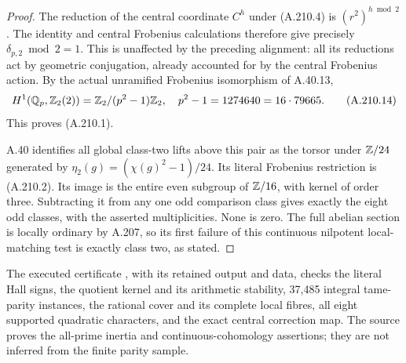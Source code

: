 \begin{proof}
The reduction of the central coordinate \(C^h\)
under (A.210.4) is \((r^2)^{h\bmod2}\).
The identity and central Frobenius calculations
therefore give precisely \(\delta_{p,2}\bmod2=1\).
This is unaffected by the preceding alignment:
all its reductions act by geometric conjugation,
already accounted for by the central Frobenius action.
By the actual unramified Frobenius isomorphism of
A.40.13,
\[
 H^1(\mathbb Q_p,\mathbb Z_2(2))=\mathbb Z_2/(p^2-1)\mathbb Z_2,
 \quad p^2-1=1274640=16\cdot79665.
\tag{A.210.14}
\]
This proves (A.210.1).

A.40 identifies all global class-two lifts above this
pair as the torsor under \(\mathbb Z/24\) generated by
\(\eta_2(g)=(\chi(g)^2-1)/24\).
Its literal Frobenius restriction is (A.210.2).
Its image is the entire even subgroup of \(\mathbb Z/16\),
with kernel of order three.  Subtracting it from
any one odd comparison class gives exactly the eight
odd classes, with the asserted multiplicities.
None is zero.  The full abelian section is locally
ordinary by A.207, so its first failure of this
continuous nilpotent local-matching test is exactly
class two, as stated.
\end{proof}

The executed certificate
, with its
retained output and data, checks the literal Hall signs,
the quotient kernel and its arithmetic stability,
37,485 integral tame-parity instances, the rational cover
and its complete local fibres, all eight supported
quadratic characters, and the exact central correction
map.  The source proves the all-prime inertia and
continuous-cohomology assertions; they are not inferred
from the finite parity sample.
